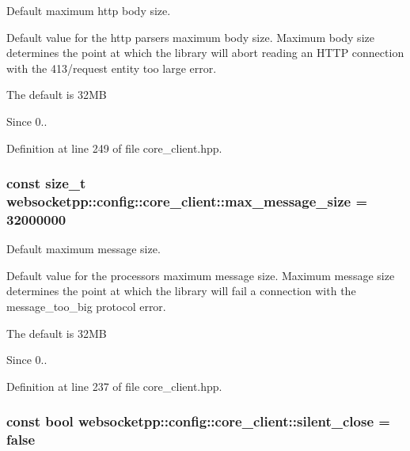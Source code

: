 Default maximum http body size. 

Default value for the http parser\textquotesingle{}s maximum body size. Maximum body size determines the point at which the library will abort reading an H\+T\+TP connection with the 413/request entity too large error.

The default is 32\+MB

\begin{DoxySince}{Since}
0.. 
\end{DoxySince}


Definition at line 249 of file core\+\_\+client.\+hpp.

\subsubsection[{\texorpdfstring{max\+\_\+message\+\_\+size}{max\_message\_size}}]{\setlength{\rightskip}{0pt plus 5cm}const size\+\_\+t websocketpp\+::config\+::core\+\_\+client\+::max\+\_\+message\+\_\+size = 32000000\hspace{0.3cm}{\ttfamily [static]}}\hypertarget{structwebsocketpp_1_1config_1_1core__client_a84c86d78867a89e10d24866deb931807}{}\label{structwebsocketpp_1_1config_1_1core__client_a84c86d78867a89e10d24866deb931807}


Default maximum message size. 

Default value for the processor\textquotesingle{}s maximum message size. Maximum message size determines the point at which the library will fail a connection with the message\+\_\+too\+\_\+big protocol error.

The default is 32\+MB

\begin{DoxySince}{Since}
0.. 
\end{DoxySince}


Definition at line 237 of file core\+\_\+client.\+hpp.

\subsubsection[{\texorpdfstring{silent\+\_\+close}{silent\_close}}]{\setlength{\rightskip}{0pt plus 5cm}const bool websocketpp\+::config\+::core\+\_\+client\+::silent\+\_\+close = false\hspace{0.3cm}{\ttfamily [static]}}\hypertarget{structwebsocketpp_1_1config_1_1core__client_affc0279e7717d68fbe5d2bb874f8d4d1}{}\label{structwebsocketpp_1_1config_1_1core__client_affc0279e7717d68fbe5d2bb874f8d4d1}


